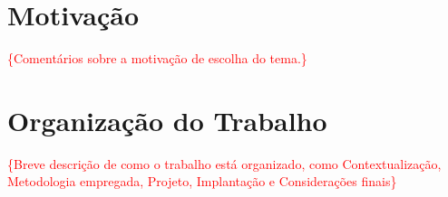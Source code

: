 \section{Motivação}
\textcolor{red}{\{Comentários sobre a motivação de escolha do tema.\}}

\section{Organização do Trabalho}

\textcolor{red}{\{Breve descrição de como o trabalho está organizado, como Contextualização, Metodologia empregada, Projeto, Implantação e Considerações finais\}}

